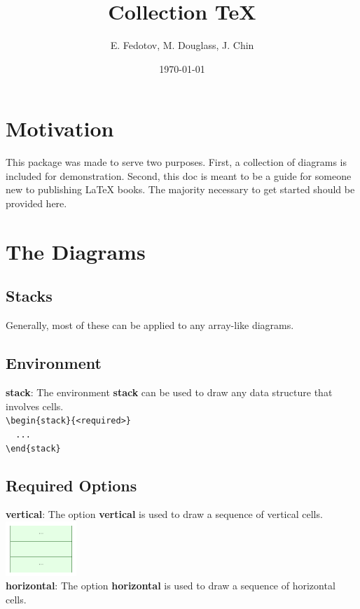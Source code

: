 \documentclass[a4paper]{article}
\title{Collection \TeX}
\author{E. Fedotov, M. Douglass, J. Chin}
\date{\today}
\begin{document}
\maketitle

\section{Motivation}
This package was made to serve two purposes. First, a collection of diagrams is included for demonstration. Second, this doc is meant to be a guide for someone new to publishing \LaTeX 
books. The majority necessary to get started should be provided here. 

\section{The Diagrams}
\subsection{Stacks}
Generally, most of these can be applied to any array-like diagrams.
\subsection{Environment}
\textbf{stack}: The environment \textbf{stack} can be used to draw any data structure that involves cells.\vspace{3mm}\\
\verb!\begin{stack}{<required>}!\\
\verb!  ...!\\
\verb!\end{stack}!

\subsection{Required Options}
\textbf{vertical}: The option \textbf{vertical} is used to draw a sequence of vertical cells.\vspace{3mm}
\includegraphics[width=0.2\textwidth]{stack_horiz.png}\\
\textbf{horizontal}: The option \textbf{horizontal} is used to draw a sequence of horizontal cells.\\
\end{document}
